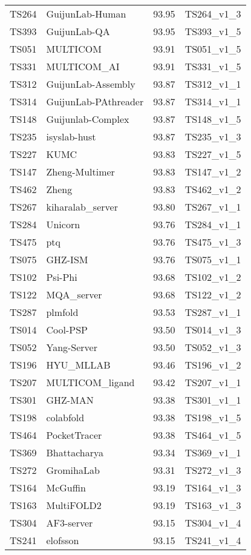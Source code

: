 \begin{longtable}{llll}
TS264 & GuijunLab-Human & 93.95 & TS264\_v1\_3 \\ 
TS393 & GuijunLab-QA & 93.95 & TS393\_v1\_5 \\ 
TS051 & MULTICOM & 93.91 & TS051\_v1\_5 \\ 
TS331 & MULTICOM\_AI & 93.91 & TS331\_v1\_5 \\ 
TS312 & GuijunLab-Assembly & 93.87 & TS312\_v1\_1 \\ 
TS314 & GuijunLab-PAthreader & 93.87 & TS314\_v1\_1 \\ 
TS148 & Guijunlab-Complex & 93.87 & TS148\_v1\_5 \\ 
TS235 & isyslab-hust & 93.87 & TS235\_v1\_3 \\ 
TS227 & KUMC & 93.83 & TS227\_v1\_5 \\ 
TS147 & Zheng-Multimer & 93.83 & TS147\_v1\_2 \\ 
TS462 & Zheng & 93.83 & TS462\_v1\_2 \\ 
TS267 & kiharalab\_server & 93.80 & TS267\_v1\_1 \\ 
TS284 & Unicorn & 93.76 & TS284\_v1\_1 \\ 
TS475 & ptq & 93.76 & TS475\_v1\_3 \\ 
TS075 & GHZ-ISM & 93.76 & TS075\_v1\_1 \\ 
TS102 & Psi-Phi & 93.68 & TS102\_v1\_2 \\ 
TS122 & MQA\_server & 93.68 & TS122\_v1\_2 \\ 
TS287 & plmfold & 93.53 & TS287\_v1\_1 \\ 
TS014 & Cool-PSP & 93.50 & TS014\_v1\_3 \\ 
TS052 & Yang-Server & 93.50 & TS052\_v1\_3 \\ 
TS196 & HYU\_MLLAB & 93.46 & TS196\_v1\_2 \\ 
TS207 & MULTICOM\_ligand & 93.42 & TS207\_v1\_1 \\ 
TS301 & GHZ-MAN & 93.38 & TS301\_v1\_1 \\ 
TS198 & colabfold & 93.38 & TS198\_v1\_5 \\ 
TS464 & PocketTracer & 93.38 & TS464\_v1\_5 \\ 
TS369 & Bhattacharya & 93.34 & TS369\_v1\_1 \\ 
TS272 & GromihaLab & 93.31 & TS272\_v1\_3 \\ 
TS164 & McGuffin & 93.19 & TS164\_v1\_3 \\ 
TS163 & MultiFOLD2 & 93.19 & TS163\_v1\_3 \\ 
TS304 & AF3-server & 93.15 & TS304\_v1\_4 \\ 
TS241 & elofsson & 93.15 & TS241\_v1\_4 \\ 

\end{longtable}
